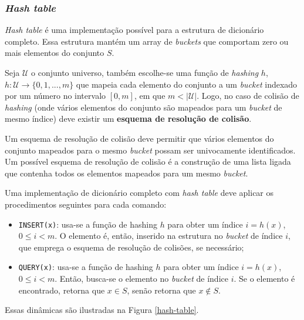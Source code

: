 \documentclass[12pt,twoside,english,brazilian]{article}
\begin{document}
\subsubsection{\textit{Hash table}}

\textit{Hash table} é uma implementação possível para a estrutura de dicionário completo. Essa estrutura mantém um array de \textit{buckets} que comportam zero ou mais elementos do conjunto $S$. 

Seja $\mathcal{U}$ o conjunto universo, também escolhe-se uma função de \textit{hashing} $h$, $h: \mathcal{U} \xrightarrow{} \{0,1,...,m\}$ que mapeia cada elemento do conjunto a um \textit{bucket} indexado por um número no intervalo $[0,m]$, em que $m < |\mathcal{U}|$. Logo, no caso de colisão de \textit{hashing} (onde vários elementos do conjunto são mapeados para um \textit{bucket} de mesmo índice) deve existir um \textbf{esquema de resolução de colisão}.

Um esquema de resolução de colisão deve permitir que vários elementos do conjunto mapeados para o mesmo \textit{bucket} possam ser univocamente identificados. Um possível esquema de resolução de colisão é a construção de uma lista ligada que contenha todos os elementos mapeados para um mesmo \textit{bucket}.

Uma implementação de dicionário completo com \textit{hash table} deve aplicar os procedimentos seguintes para cada comando:
\begin{itemize}
    \item \texttt{INSERT(x)}: usa-se a função de hashing $h$ para obter um índice $i = h(x)$, $0 \leq i < m$. O elemento é, então, inserido na estrutura no \textit{bucket} de índice $i$, que emprega o esquema de resolução de colisões, se necessário;
    \item \texttt{QUERY(x)}: usa-se a função de hashing $h$ para obter um índice $i = h(x)$, $0 \leq i < m$. Então, busca-se o elemento no \textit{bucket} de índice $i$. Se o elemento é encontrado, retorna que $x \in S$, senão retorna que $x \notin S$.
\end{itemize}

Essas dinâmicas são ilustradas na Figura \ref{hash-table}.
\end{document}
